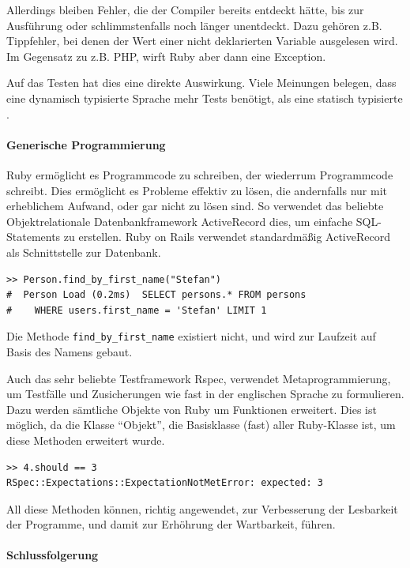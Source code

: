 Allerdings bleiben Fehler, die der Compiler bereits entdeckt hätte, bis zur Ausführung oder schlimmstenfalls noch länger unentdeckt. Dazu gehören z.B. Tippfehler, bei denen der Wert einer nicht deklarierten Variable ausgelesen wird. Im Gegensatz zu z.B. PHP, wirft Ruby aber dann eine Exception.

Auf das Testen hat dies eine direkte Auswirkung. Viele Meinungen belegen, dass eine dynamisch typisierte Sprache mehr Tests benötigt, als eine statisch typisierte \citep{daniel_spiewak_dynamic_2010}. 



\paragraph{Generische Programmierung}
Ruby ermöglicht es Programmcode zu schreiben, der wiederrum Programmcode schreibt. Dies ermöglicht es Probleme effektiv zu lösen, die andernfalls nur mit erheblichem Aufwand, oder gar nicht zu lösen sind. So verwendet das beliebte Objektrelationale Datenbankframework ActiveRecord dies, um einfache SQL-Statements zu erstellen. Ruby on Rails verwendet standardmäßig ActiveRecord als Schnittstelle zur Datenbank.
\begin{lstlisting}
>> Person.find_by_first_name("Stefan")
#  Person Load (0.2ms)  SELECT persons.* FROM persons
#    WHERE users.first_name = 'Stefan' LIMIT 1
\end{lstlisting}

Die Methode \texttt{find\_by\_first\_name} existiert nicht, und wird zur Laufzeit auf Basis des Namens gebaut.

Auch das sehr beliebte Testframework Rspec, verwendet Metaprogrammierung, um Testfälle und Zusicherungen wie fast in der englischen Sprache zu formulieren. Dazu werden sämtliche Objekte von Ruby um Funktionen erweitert. Dies ist möglich, da die Klasse "`Objekt"', die Basisklasse (fast) aller Ruby-Klasse ist, um diese Methoden erweitert wurde.

\begin{lstlisting}
>> 4.should == 3
RSpec::Expectations::ExpectationNotMetError: expected: 3
\end{lstlisting}

All diese Methoden können, richtig angewendet, zur Verbesserung der Lesbarkeit der Programme, und damit zur Erhöhrung der Wartbarkeit, führen.

\paragraph{Schlussfolgerung}

